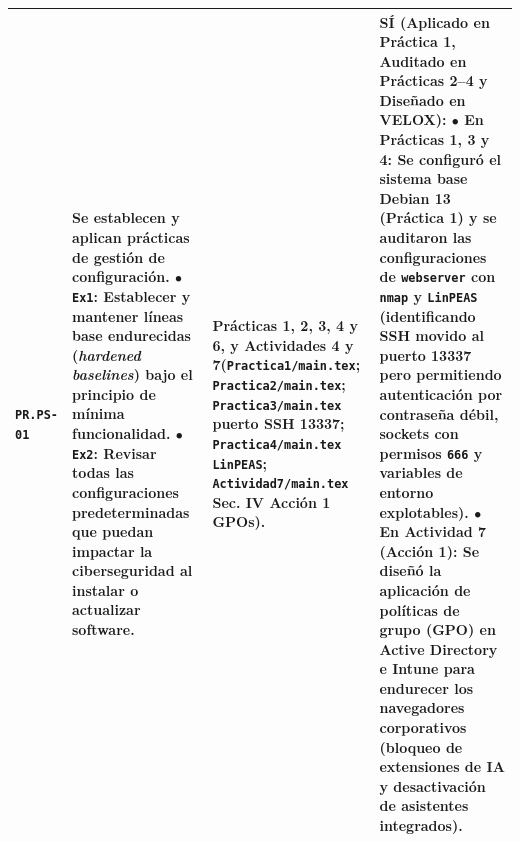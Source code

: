 \documentclass[letterpaper,11pt]{article}
\begin{document}
\begin{longtable}{|C{1.5cm}|L{5.3cm}|L{4.3cm}|L{5.8cm}|}
\texttt{PR.PS-01} &
\textbf{Se establecen y aplican prácticas de gestión de configuración.}\newline
$\bullet$ \texttt{Ex1}: Establecer y mantener líneas base endurecidas (\textit{hardened baselines}) bajo el principio de mínima funcionalidad.\newline
$\bullet$ \texttt{Ex2}: \textbf{Revisar todas las configuraciones predeterminadas que puedan impactar la ciberseguridad al instalar o actualizar software}. &
\textbf{Prácticas 1, 2, 3, 4 y 6, y Actividades 4 y 7}\newline (\texttt{Practica1/main.tex}; \texttt{Practica2/main.tex}; \texttt{Practica3/main.tex} puerto SSH 13337; \texttt{Practica4/main.tex} \texttt{LinPEAS}; \texttt{Actividad7/main.tex} Sec. IV Acción 1 GPOs). &
\textbf{SÍ (Aplicado en Práctica 1, Auditado en Prácticas 2--4 y Diseñado en VELOX):}\newline
$\bullet$ \textbf{En Prácticas 1, 3 y 4:} Se configuró el sistema base Debian 13 (Práctica 1) y se auditaron las configuraciones de \texttt{webserver} con \texttt{nmap} y \texttt{LinPEAS} (identificando SSH movido al puerto 13337 pero permitiendo autenticación por contraseña débil, sockets con permisos \texttt{666} y variables de entorno explotables).\newline
$\bullet$ \textbf{En Actividad 7 (Acción 1):} Se diseñó la aplicación de políticas de grupo (\textbf{GPO}) en Active Directory e Intune para endurecer los navegadores corporativos (bloqueo de extensiones de IA y desactivación de asistentes integrados). \\
\hline


\end{longtable}
\end{document}
